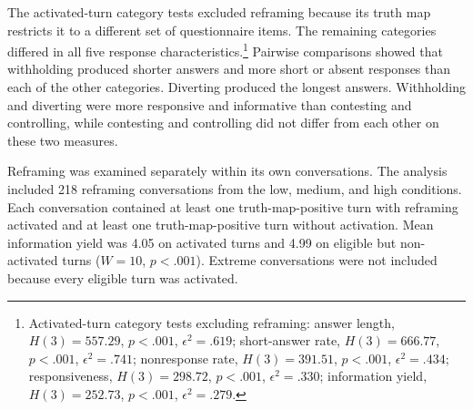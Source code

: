 The activated-turn category tests excluded reframing because its truth map restricts it to a different set of questionnaire items. The remaining categories differed in all five response characteristics.\footnote{Activated-turn category tests excluding reframing: answer length, $H(3)=557.29$, $p<.001$, $\epsilon^2=.619$; short-answer rate, $H(3)=666.77$, $p<.001$, $\epsilon^2=.741$; nonresponse rate, $H(3)=391.51$, $p<.001$, $\epsilon^2=.434$; responsiveness, $H(3)=298.72$, $p<.001$, $\epsilon^2=.330$; information yield, $H(3)=252.73$, $p<.001$, $\epsilon^2=.279$.} Pairwise comparisons showed that withholding produced shorter answers and more short or absent responses than each of the other categories. Diverting produced the longest answers. Withholding and diverting were more responsive and informative than contesting and controlling, while contesting and controlling did not differ from each other on these two measures.

Reframing was examined separately within its own conversations. The analysis included 218 reframing conversations from the low, medium, and high conditions. Each conversation contained at least one truth-map-positive turn with reframing activated and at least one truth-map-positive turn without activation. Mean information yield was 4.05 on activated turns and 4.99 on eligible but non-activated turns ($W=10$, $p<.001$). Extreme conversations were not included because every eligible turn was activated.

\begin{table}[t]
\centering
\caption{Baseline reference and activated-turn response characteristics by resistance category.}
\label{tab:rq4-category}
\end{table}

\FloatBarrier

